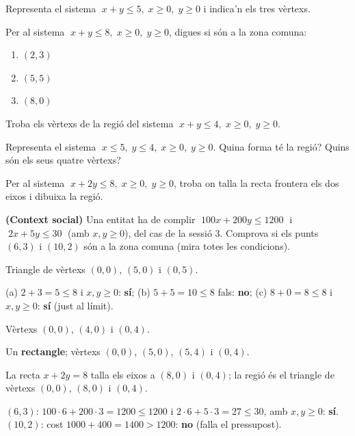 \begin{exercicis}
\begin{exlist}
  \item Representa el sistema $\;x+y\le 5,\;x\ge 0,\;y\ge 0$ i indica'n els tres
        vèrtexs.
  \item Per al sistema $\;x+y\le 8,\;x\ge 0,\;y\ge 0$, digues si són a la zona comuna:
        \begin{enumerate}[label=\alph*), leftmargin=1.6em, topsep=2pt]
          \item $(2,3)$ \hfill \item $(5,5)$ \hfill \item $(8,0)$
        \end{enumerate}
  \item Troba els vèrtexs de la regió del sistema $\;x+y\le 4,\;x\ge 0,\;y\ge 0$.
  \item Representa el sistema $\;x\le 5,\;y\le 4,\;x\ge 0,\;y\ge 0$. Quina forma té la
        regió? Quins són els seus quatre vèrtexs?
  \item Per al sistema $\;x+2y\le 8,\;x\ge 0,\;y\ge 0$, troba on talla la recta
        frontera els dos eixos i dibuixa la regió.
  \item \textbf{(Context social)} Una entitat ha de complir
        $\;100x+200y\le\num{1200}\;$ i $\;2x+5y\le 30\;$ (amb $x,y\ge 0$), del cas de
        la sessió 3. Comprova si els punts $(6,3)$ i $(10,2)$ són a la zona comuna
        (mira totes les condicions).
\end{exlist}
\end{exercicis}

\begin{solucions}
\begin{sollist}
  \item Triangle de vèrtexs $(0,0)$, $(5,0)$ i $(0,5)$.
  \item (a) $2+3=5\le 8$ i $x,y\ge 0$: \textbf{sí}; \quad
        (b) $5+5=10\le 8$ fals: \textbf{no}; \quad
        (c) $8+0=8\le 8$ i $x,y\ge 0$: \textbf{sí} (just al límit).
  \item Vèrtexs $(0,0)$, $(4,0)$ i $(0,4)$.
  \item Un \textbf{rectangle}; vèrtexs $(0,0)$, $(5,0)$, $(5,4)$ i $(0,4)$.
  \item La recta $x+2y=8$ talla els eixos a $(8,0)$ i $(0,4)$; la regió és el triangle
        de vèrtexs $(0,0)$, $(8,0)$ i $(0,4)$.
  \item $(6,3)$: $100\cdot 6+200\cdot 3=\num{1200}\le\num{1200}$ i
        $2\cdot 6+5\cdot 3=27\le 30$, amb $x,y\ge 0$: \textbf{sí}.
        $(10,2)$: cost $\num{1000}+400=\num{1400}>\num{1200}$: \textbf{no} (falla el
        pressupost).
\end{sollist}
\end{solucions}
